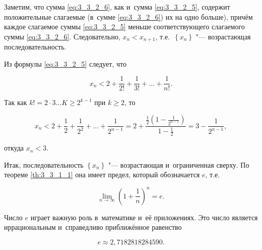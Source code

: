 \noindent
Заметим, что сумма \eqref{eq:3_3_2_6}, как и~сумма \eqref{eq:3_3_2_5},
содержит положительные слагаемые (в~сумме \eqref{eq:3_3_2_6}) их на одно больше),
причём каждое слагаемое суммы \eqref{eq:3_3_2_5} меньше соответствующего
слагаемого суммы \eqref{eq:3_3_2_6}.
Следовательно, $x_{n} < x_{n+1}$, т.е.\ $\left\{ x_{n} \right\}$
"--- возрастающая последовательность.

Из формулы \eqref{eq:3_3_2_5} следует, что

\begin{equation*}
\displaystyle x_{n} < 2 + \frac{1}{2!} + \frac{1}{3!} + \dots + \frac{1}{n!}.
\end{equation*}

\noindent
Так как $k! = 2 \cdot 3 \dots K \geqslant 2^{k-1}$ при $k \geqslant 2$, то

\begin{equation*}
\displaystyle x_{n} < 2 + \frac{1}{2} + \frac{1}{2^{2}} + \dots + \frac{1}{2^{n-1}} = 
2 + \frac{\frac{1}{2}\left( 1 - \frac{1}{2^{n-1}} \right)}{1 - \frac{1}{2}} =
3 - \frac{1}{2^{n-1}},
\end{equation*}

\noindent
откуда $x_{n} < 3$.

Итак, последовательность $\left\{ x_{n} \right\}$ "--- возрастающая
и~ограниченная сверху. По теореме \ref{th:3_3_1_1} она имеет предел, который обозначается $e$,
т.е.\

\begin{equation*}
\displaystyle \lim_{n \to \infty} \left( 1 + \frac{1}{n} \right)^{n} = e.
\end{equation*}

Число $e$ играет важную роль в~математике и~её приложениях.
Это число является иррациональным и~справедливо приближённое равенство

\begin{equation*}
e \approx 2{,}7182818284590 .
\end{equation*}
